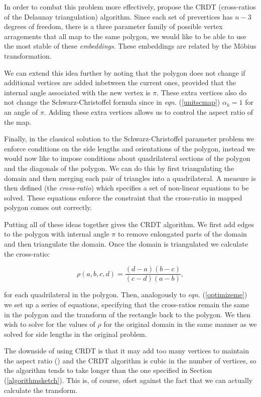 \documentclass[a4paper,10pt]{amsart}
\newcommand{\sch}{Schwarz-Christoffel }
\newcommand{\eqn}[1]{\emph{eqn.} (\ref{#1})}
\begin{document}
In order to combat this problem more effectively, \cite{vavasis96} propose the CRDT (cross-ratios of the Delaunay triangulation) algorithm. Since each set of prevertices has $n-3$ degrees of freedom, there is a three parameter family of possible vertex arragements that all map to the same polygon, we would like to be able to use the most stable of these \emph{embeddings}. These embeddings are related by the M\"{o}bius transformation.

We can extend this idea further by noting that the polygon does not change if additional vertices are added inbetween the current ones, provided that the internal angle associated with the new vertex is $\pi$. These extra vertices also do not change the \sch formula since in \eqn{unitscmap} $\alpha_k=1$ for an angle of $\pi$. Adding these extra vertices allows us to control the aspect ratio of the map.

Finally, in the classical solution to the \sch parameter problem we enforce conditions on the side lengths and orientations of the polygon, instead we would now like to impose conditions about quadrilateral sections of the polygon and the diagonals of the polygon. We can do this by first triangulating the domain and then merging each pair of triangles into a quadrilateral. A measure is then defined (the \emph{cross-ratio}) which specifies a set of non-linear equations to be solved. These equations enforce the constraint that the cross-ratio in mapped polygon comes out correctly. 

Putting all of these ideas together gives the CRDT algorithm. We first add edges to the polygon with internal angle $\pi$ to remove enlongated parts of the domain and then triangulate the domain. Once the domain is triangulated we calculate the cross-ratio:

\begin{equation}
\rho(a,b,c,d) = \frac{(d-a)(b-c)}{(c-d)(a-b)},
\end{equation}

for each quadrilateral in the polygon. Then, analogously to \eqn{optimizeme} we set up a series of equations, specifying that the cross-ratios remain the same in the polygon and the transform of the rectangle back to the polygon. We then wish to solve for the values of $\rho$ for the original domain in the same manner as we solved for side lengths in the original problem. 

The downside of using CRDT is that it may add too many vertices to maintain the aspect ratio (\cite{driscoll05}) and the CRDT algorithm is cubic in the number of vertices, so the algorithm tends to take longer than the one specified in Section (\ref{algorithmsketch}). This is, of course, ofset against the fact that we can actually calculate the transform.



\end{document}
